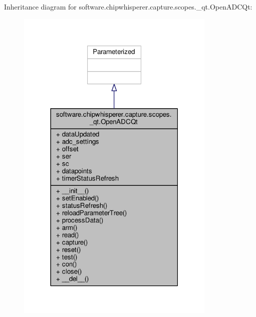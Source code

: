 Inheritance diagram for software.\+chipwhisperer.\+capture.\+scopes.\+\_\+qt.\+Open\+A\+D\+C\+Qt\+:\nopagebreak
\begin{figure}[H]
\begin{center}
\leavevmode
\includegraphics[width=270pt]{d2/d52/classsoftware_1_1chipwhisperer_1_1capture_1_1scopes_1_1__qt_1_1OpenADCQt__inherit__graph}
\end{center}
\end{figure}


